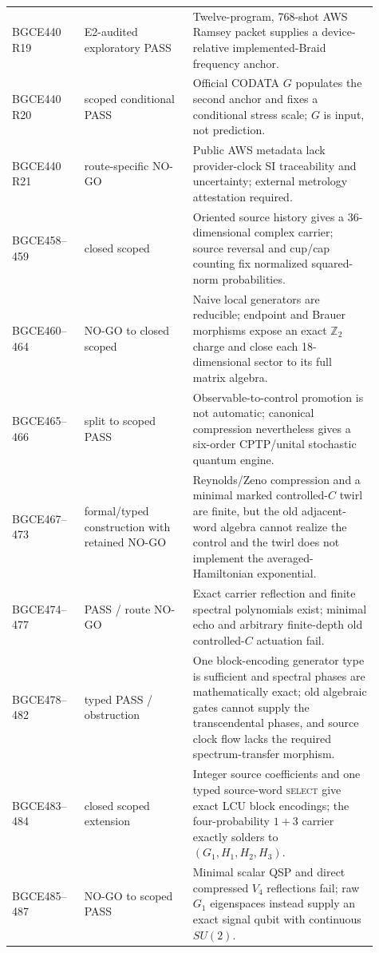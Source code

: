 \documentclass[11pt]{article}
\theoremstyle{definition}
\theoremstyle{remark}
\begin{document}
\begin{longtable}{>{\raggedright\arraybackslash}p{0.18\linewidth} >{\raggedright\arraybackslash}p{0.27\linewidth} >{\raggedright\arraybackslash}p{0.46\linewidth}}
BGCE440 R19 & E2-audited exploratory PASS & Twelve-program, 768-shot AWS Ramsey packet supplies a device-relative implemented-Braid frequency anchor. \\
BGCE440 R20 & scoped conditional PASS & Official CODATA $G$ populates the second anchor and fixes a conditional stress scale; $G$ is input, not prediction. \\
BGCE440 R21 & route-specific NO-GO & Public AWS metadata lack provider-clock SI traceability and uncertainty; external metrology attestation required. \\
BGCE458--459 & closed scoped & Oriented source history gives a 36-dimensional complex carrier; source reversal and cup/cap counting fix normalized squared-norm probabilities. \\
BGCE460--464 & NO-GO to closed scoped & Naive local generators are reducible; endpoint and Brauer morphisms expose an exact $\mathbb Z_2$ charge and close each 18-dimensional sector to its full matrix algebra. \\
BGCE465--466 & split to scoped PASS & Observable-to-control promotion is not automatic; canonical compression nevertheless gives a six-order CPTP/unital stochastic quantum engine. \\
BGCE467--473 & formal/typed construction with retained NO-GO & Reynolds/Zeno compression and a minimal marked controlled-$C$ twirl are finite, but the old adjacent-word algebra cannot realize the control and the twirl does not implement the averaged-Hamiltonian exponential. \\
BGCE474--477 & PASS / route NO-GO & Exact carrier reflection and finite spectral polynomials exist; minimal echo and arbitrary finite-depth old controlled-$C$ actuation fail. \\
BGCE478--482 & typed PASS / obstruction & One block-encoding generator type is sufficient and spectral phases are mathematically exact; old algebraic gates cannot supply the transcendental phases, and source clock flow lacks the required spectrum-transfer morphism. \\
BGCE483--484 & closed scoped extension & Integer source coefficients and one typed source-word \textsc{select} give exact LCU block encodings; the four-probability $1+3$ carrier exactly solders to $(G_1,H_1,H_2,H_3)$. \\
BGCE485--487 & NO-GO to scoped PASS & Minimal scalar QSP and direct compressed $V_4$ reflections fail; raw $G_1$ eigenspaces instead supply an exact signal qubit with continuous $SU(2)$. \\

\end{longtable}
\end{document}
